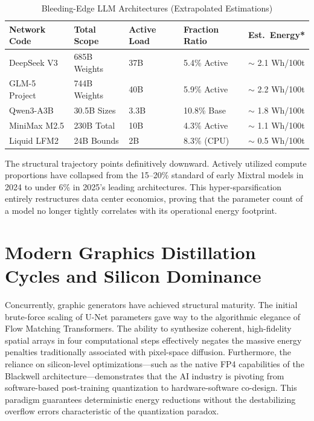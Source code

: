 \documentclass[12pt, a4paper]{report}
\begin{document}
\begin{table}[htbp]
\centering
\caption{Bleeding-Edge LLM Architectures (Extrapolated Estimations)}\label{tab:advanced_moe}
\renewcommand{\arraystretch}{1.2}
\begin{tabular}{l l l l l}
\toprule
\textbf{Network Code} & \textbf{Total Scope} & \textbf{Active Load} & \textbf{Fraction Ratio} & \textbf{Est.~Energy*} \\
\midrule
DeepSeek V3    & 685B Weights & 37B    & 5.4\% Active  & $\sim$ 2.1 Wh/100t \\
GLM-5 Project  & 744B Weights & 40B    & 5.9\% Active  & $\sim$ 2.2 Wh/100t \\
Qwen3-A3B      & 30.5B Sizes  & 3.3B   & 10.8\% Base   & $\sim$ 1.8 Wh/100t \\
MiniMax M2.5   & 230B Total   & 10B    & 4.3\% Active  & $\sim$ 1.1 Wh/100t \\
Liquid LFM2    & 24B Bounds   & 2B     & 8.3\% (CPU)   & $\sim$ 0.5 Wh/100t \\
\bottomrule
\end{tabular}
\end{table}

The structural trajectory points definitively downward. Actively utilized compute proportions have collapsed from the 15--20\% standard of early Mixtral models in 2024 to under 6\% in 2025's leading architectures. This hyper-sparsification entirely restructures data center economics, proving that the parameter count of a model no longer tightly correlates with its operational energy footprint.

\section{Modern Graphics Distillation Cycles and Silicon Dominance}
Concurrently, graphic generators have achieved structural maturity. The initial brute-force scaling of U-Net parameters gave way to the algorithmic elegance of Flow Matching Transformers. The ability to synthesize coherent, high-fidelity spatial arrays in four computational steps effectively negates the massive energy penalties traditionally associated with pixel-space diffusion. Furthermore, the reliance on silicon-level optimizations—such as the native FP4 capabilities of the Blackwell architecture—demonstrates that the AI industry is pivoting from software-based post-training quantization to hardware-software co-design. This paradigm guarantees deterministic energy reductions without the destabilizing overflow errors characteristic of the quantization paradox.
\end{document}
